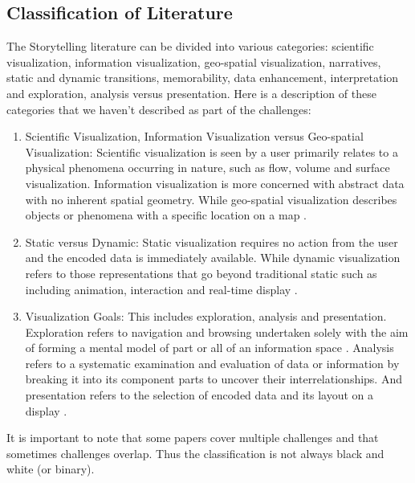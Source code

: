 \documentclass{egpubl}
\begin{document}
\subsection{Classification of Literature}
The Storytelling literature can be divided into various categories: scientific visualization, information visualization, geo-spatial visualization, narratives, static and dynamic transitions, memorability, data enhancement, interpretation and exploration, analysis versus presentation. Here is a description of these categories that we haven't described as part of the challenges:
\begin{enumerate}
	\item Scientific Visualization, Information Visualization versus Geo-spatial Visualization: Scientific visualization is seen by a user primarily relates to a physical phenomena occurring in nature, such as flow, volume and surface visualization. Information visualization is more concerned with abstract data with no inherent spatial geometry. While geo-spatial visualization describes objects or phenomena with a specific location on a map \cite{spence2007}.
	\item Static versus Dynamic: Static visualization requires no action from the user and the encoded data is immediately available. While dynamic visualization refers to those representations that go beyond traditional static such as including animation, interaction and real-time display \cite{spence2007}.
	\item Visualization Goals: This includes exploration, analysis and presentation. Exploration refers to navigation and browsing undertaken solely with the aim of forming a mental model of part or all of an information space \cite{spence2007}. Analysis refers to a systematic examination and evaluation of data or information by breaking it into its component parts to uncover their interrelationships. And presentation refers to the selection of encoded data and its layout on a display \cite{spence2007}.
\end{enumerate}

It is important to note that some papers cover multiple challenges and that sometimes challenges overlap. Thus the classification is not always black and white (or binary).
\end{document}
